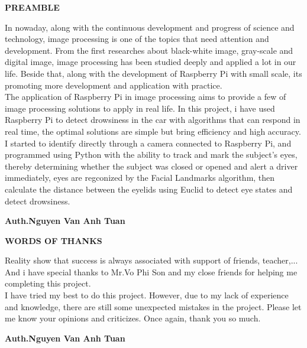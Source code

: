 \documentclass[a4paper,13pt]{report}
\begin{document}
    \newpage
    \thispagestyle{plain}
    \centering
    \centerline{\textbf{\huge{PREAMBLE}}}
    \vspace{10mm}
    \begin{flushleft}
        In nowaday, along with the continuous development and progress of science and technology, image processing is 
        one of the topics that need attention and development. From the first researches about black-white image, 
        gray-scale and digital image, image processing has been studied deeply and applied a lot in our life. Beside that, 
        along with the development of Raspberry Pi with small scale, its promoting more development and application with 
        practice. \\ 
        \vspace{2mm}
        The application of Raspberry Pi in image processing aims to provide a few of image processing solutions to apply in 
        real life. In this project, i have used Raspberry Pi to detect drowsiness in the car with algorithms that can respond 
        in real time, the optimal solutions are simple but bring efficiency and high accuracy. I started to identify directly 
        through a camera connected to Raspberry Pi, and programmed using Python with the ability to track and mark the subject's 
        eyes, thereby determining whether the subject was closed or opened and alert a driver immediately, eyes are regconized by 
        the Facial Landmarks algorithm, then calculate the distance between the eyelids using Euclid to detect eye states and detect 
        drowsiness.
    \end{flushleft}
    \begin{flushright}
        \textbf{Auth.Nguyen Van Anh Tuan}
    \end{flushright}

    \newpage
    \thispagestyle{plain}
    \centering
    \centerline{\textbf{\huge{WORDS OF THANKS}}}
    \vspace{10mm}
    \begin{flushleft}
        Reality show that success is always associated with support of friends, teacher,... And i have special thanks to Mr.Vo Phi Son and my close friends 
        for helping me completing this project. \\ 
        \vspace{2mm}
        I have tried my best to do this project. However, due to my lack of experience and 
        knowledge, there are still some unexpected mistakes in the project. Please let me know your opinions and criticizes.
        Once again, thank you so much. 
    \end{flushleft}
    \begin{flushright}
        \textbf{Auth.Nguyen Van Anh Tuan}
    \end{flushright}
\end{document}
